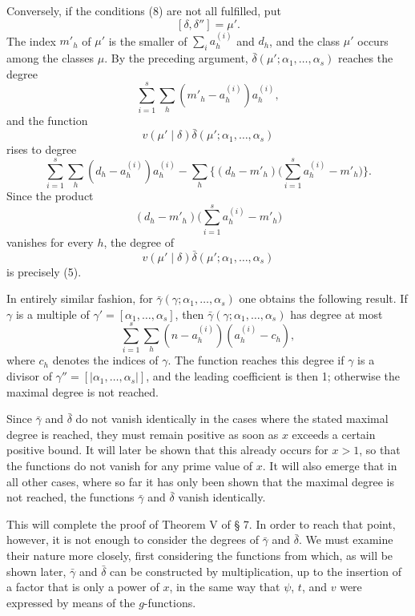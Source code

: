 Conversely, if the conditions (8) are not all fulfilled, put
\[
 [\delta,\delta'']=\mu'.
\]
The index $m'_h$ of $\mu'$ is the smaller of $\sum_i a_h^{(i)}$ and $d_h$, and the class $\mu'$ occurs among the classes $\mu$. By the preceding argument, $\bar\delta(\mu';\alpha_1,
\ldots,\alpha_s)$ reaches the degree
\[
 \sum_{i=1}^s\sum_h(m'_h-a_h^{(i)})a_h^{(i)},
\]
and the function
\[
 v(\mu'\mid\delta)\bar\delta(\mu';\alpha_1,
\ldots,\alpha_s)
\]
rises to degree
\[
 \sum_{i=1}^s\sum_h(d_h-a_h^{(i)})a_h^{(i)}
 -\sum_h\biggl\{(d_h-m'_h)\biggl(\sum_{i=1}^s a_h^{(i)}-m'_h\biggr)\biggr\}.
\]
Since the product
\[
 (d_h-m'_h)\biggl(\sum_{i=1}^s a_h^{(i)}-m'_h\biggr)
\]
vanishes for every $h$, the degree of
\[
 v(\mu'\mid\delta)\bar\delta(\mu';\alpha_1,
\ldots,\alpha_s)
\]
is precisely (5).

In entirely similar fashion, for $\bar\gamma(\gamma;\alpha_1,
\ldots,\alpha_s)$ one obtains the following result. If $\gamma$ is a multiple of $\gamma'=[\alpha_1,
\ldots,\alpha_s]$, then $\bar\gamma(\gamma;\alpha_1,
\ldots,\alpha_s)$ has degree at most
\begin{equation}
 \sum_{i=1}^s\sum_h(n-a_h^{(i)})(a_h^{(i)}-c_h),
\tag{10}
\end{equation}
where $c_h$ denotes the indices of $\gamma$. The function reaches this degree if $\gamma$ is a divisor of $\gamma''=[|\alpha_1,
\ldots,\alpha_s|]$, and the leading coefficient is then 1; otherwise the maximal degree is not reached.

Since $\bar\gamma$ and $\bar\delta$ do not vanish identically in the cases where the stated maximal degree is reached, they must remain positive as soon as $x$ exceeds a certain positive bound. It will later be shown that this already occurs for $x>1$, so that the functions do not vanish for any prime value of $x$. It will also emerge that in all other cases, where so far it has only been shown that the maximal degree is not reached, the functions $\bar\gamma$ and $\bar\delta$ vanish identically.

This will complete the proof of Theorem V of § 7. In order to reach that point, however, it is not enough to consider the degrees of $\bar\gamma$ and $\bar\delta$. We must examine their nature more closely, first considering the functions from which, as will be shown later, $\bar\gamma$ and $\bar\delta$ can be constructed by multiplication, up to the insertion of a factor that is only a power of $x$, in the same way that $\psi$, $t$, and $v$ were expressed by means of the $g$-functions.

